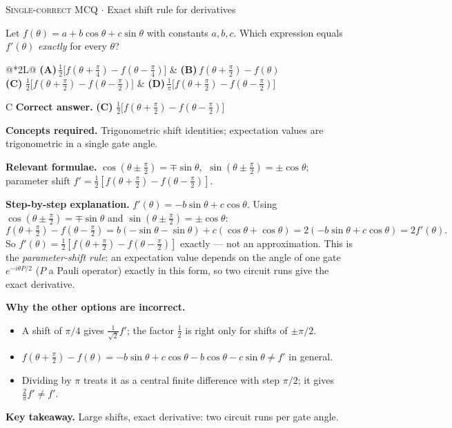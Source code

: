 \documentclass[11pt,a4paper]{article}
\newcommand{\optlabel}[1]{\textbf{(#1)}}
\newcommand{\correctlabel}[1]{\textcolor{okgreen}{\textbf{(#1)}\,\ding{51}}}
\newenvironment{qitem}[1]{\begin{list}{}{\setlength{\leftmargin}{3.3em}\setlength{\labelwidth}{3.1em}%
  \setlength{\labelsep}{0.2em}\setlength{\topsep}{3pt}\setlength{\parsep}{3pt}}\item[\textbf{Q.#1}\hfill]}{\end{list}}
\newcommand{\qsep}{\par\vspace{2pt}{\color{black!15}\hrule}\vspace{4pt}}
\newcommand{\qmeta}[2]{{\footnotesize\color{black!60}\textsc{#1} \;$\cdot$\; #2}\par}
\begin{document}
\begin{qitem}{16}
\qmeta{Single-correct MCQ}{Exact shift rule for derivatives}
Let $f(\theta) = a + b\cos\theta + c\sin\theta$ with constants $a, b, c$. Which expression equals $f'(\theta)$
\emph{exactly} for every $\theta$?
\par\smallskip\noindent\begin{tabularx}{\linewidth}{@{}*{2}{L}@{}}
\optlabel{A}\,$\tfrac12\big[f(\theta + \tfrac\pi4) - f(\theta - \tfrac\pi4)\big]$ & \optlabel{B}\,$f(\theta + \tfrac\pi2) - f(\theta)$ \\[3pt]
\correctlabel{C}\,$\tfrac12\big[f(\theta + \tfrac\pi2) - f(\theta - \tfrac\pi2)\big]$ & \optlabel{D}\,$\tfrac1\pi\big[f(\theta + \tfrac\pi2) - f(\theta - \tfrac\pi2)\big]$
\end{tabularx}
\end{qitem}
\begin{solbox}{C}
\textbf{\color{brand}Correct answer.} \textcolor{okgreen}{\textbf{(C)}} $\tfrac12\big[f(\theta + \tfrac\pi2) - f(\theta - \tfrac\pi2)\big]$

\textbf{\color{brand}Concepts required.} Trigonometric shift identities; expectation values are trigonometric in a single gate angle.

\textbf{\color{brand}Relevant formulae.} $\cos(\theta\pm\tfrac\pi2) = \mp\sin\theta$, $\ \sin(\theta\pm\tfrac\pi2) = \pm\cos\theta$; parameter shift $f' = \tfrac12[f(\theta + \tfrac\pi2) - f(\theta - \tfrac\pi2)]$.

\textbf{\color{brand}Step-by-step explanation.} $f'(\theta) = -b\sin\theta + c\cos\theta$. Using $\cos(\theta \pm \tfrac\pi2) = \mp\sin\theta$ and $\sin(\theta \pm \tfrac\pi2) = \pm\cos\theta$:
\[ f(\theta + \tfrac\pi2) - f(\theta - \tfrac\pi2) = b(-\sin\theta - \sin\theta) + c(\cos\theta + \cos\theta) = 2(-b\sin\theta + c\cos\theta) = 2f'(\theta). \]
So $f'(\theta) = \tfrac12[f(\theta + \tfrac\pi2) - f(\theta - \tfrac\pi2)]$ exactly --- not an approximation. This is the
\emph{parameter-shift rule}: an expectation value depends on the angle of one gate $e^{-i\theta P/2}$ ($P$ a Pauli
operator) exactly in this form, so two circuit runs give the exact derivative.

\textbf{\color{brand}Why the other options are incorrect.}
\begin{itemize}[leftmargin=2.4em, itemsep=1pt, topsep=2pt]
\item[\textbf{(A)}] A shift of $\pi/4$ gives $\frac{1}{\sqrt2}f'$; the factor $\frac12$ is right only for shifts of $\pm\pi/2$.
\item[\textbf{(B)}] $f(\theta + \frac\pi2) - f(\theta) = -b\sin\theta + c\cos\theta - b\cos\theta - c\sin\theta \neq f'$ in general.
\item[\textbf{(D)}] Dividing by $\pi$ treats it as a central finite difference with step $\pi/2$; it gives $\frac2\pi f' \neq f'$.
\end{itemize}
\textbf{\color{brand}Key takeaway.} Large shifts, exact derivative: two circuit runs per gate angle.
\end{solbox}
\qsep
\end{document}
